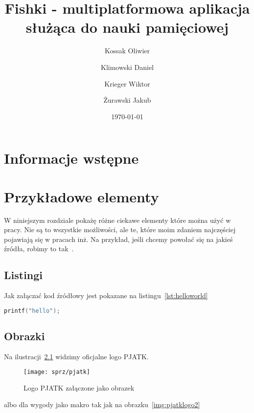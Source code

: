 \documentclass{sprz}
\title{Fishki - multiplatformowa aplikacja służąca do nauki pamięciowej}
\author{Kossak Oliwier}{s22018}{Sztuczna Inteligencja}{Niestacjonarny}
\author{Klimowski Daniel}{s18504}{Sztuczna Inteligencja}{Niestacjonarny}
\author{Krieger Wiktor}{s23638}{Sztuczna Inteligencja}{Niestacjonarny}
\author{Żurawski Jakub}{s23047}{Sztuczna Inteligencja}{Niestacjonarny}
\date{\today}
\begin{document}
    \maketitle

    \makeprojectcard
    \makedeclaration

    \tableofcontents

    \chapter{Informacje wstępne}
    


    \chapter{Przykładowe elementy}

    W niniejszym rozdziale pokażę różne ciekawe elementy które można użyć w pracy. Nie są to wszystkie możliwości, ale te, które moim zdaniem najczęściej pojawiają się w pracach inż. Na przykład, jeśli chcemy powołać się na jakieś źródła, robimy to tak~\cite{BEHESHTIROUI2021107419}.

    \section{Listingi}

    Jak załączać kod źródłowy jest pokazane na listingu~\ref{lst:helloworld}


    \begin{lstlisting}[language=c,caption={Przykładowy witaj w świecie}, label={lst:helloworld}]
printf("hello");
    \end{lstlisting}

    \section{Obrazki}

    Na ilustracji~\ref{img:pjatklogo} widzimy oficjalne logo PJATK.

    \begin{figure}[h]
        \centering
        \texttt{[image: sprz/pjatk]}
        \caption{Logo PJATK załączone jako obrazek}
        \label{img:pjatklogo}
    \end{figure}

    albo dla wygody jako makro tak jak na obrazku~\ref{img:pjatklogo2}

\end{document}
